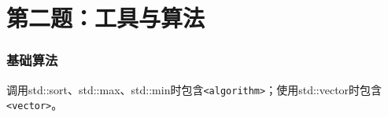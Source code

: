 \clearpage
\part{第二题：工具与算法}
\section{基础算法}
调用std::sort、std::max、std::min时包含\texttt{<algorithm>}；使用std::vector时包含\texttt{<vector>}。
